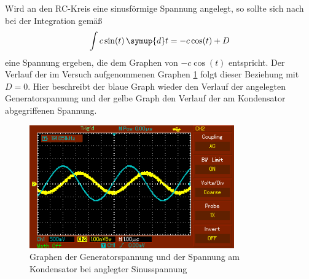 Wird an den RC-Kreis eine sinusförmige Spannung angelegt, so sollte sich nach bei der
Integration gemäß
\begin{equation}
  \int c\sin(t) \, \symup{d}t=-c\cos(t) + D
\end{equation}
eine Spannung ergeben, die dem Graphen von $-c\cos(t)$ entspricht. Der Verlauf der
im Versuch aufgenommenen Graphen \ref{fig:sinus} folgt dieser Beziehung mit $D = 0$. Hier beschreibt der blaue Graph
wieder den Verlauf der angelegten Generatorspannung und der gelbe Graph den Verlauf der
am Kondensator abgegriffenen Spannung.
\begin{figure}
  \centering
  \includegraphics[width=250pt]{data/integration_sinus.PNG}
  \caption{Graphen der Generatorspannung und der Spannung am Kondensator bei anglegter
  Sinusspannung}
  \label{fig:sinus}
\end{figure}
